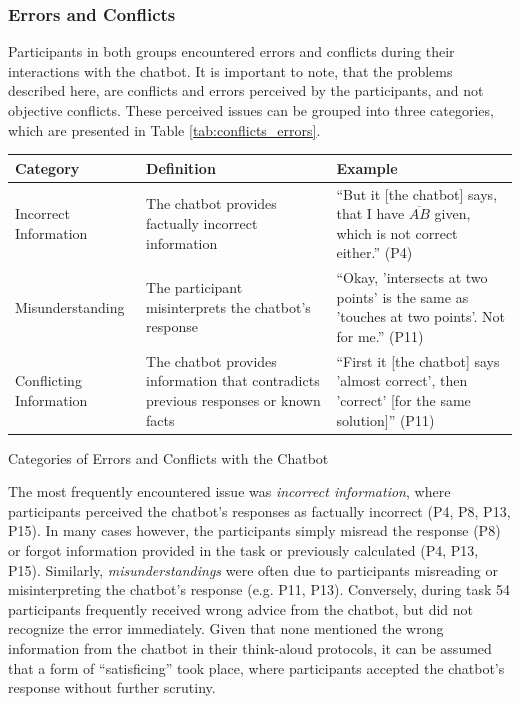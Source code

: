 \subsubsection{Errors and Conflicts} \label{sssec:errors_conflicts}

Participants in both groups encountered errors and conflicts during their interactions with the chatbot. It is important to note, that the problems described here, are conflicts and errors perceived by the participants, and not objective conflicts. These perceived issues can be grouped into three categories, which are presented in Table \ref{tab:conflicts_errors}.


\begin{ctable}
    \begin{tabularx}{\textwidth}{l|X|X}
        \textbf{Category} & \textbf{Definition} & \textbf{Example} \\
        \hline
        Incorrect Information & The chatbot provides factually incorrect information & “But it [the chatbot] says, that I have $\overline{AB}$ given, which is not correct either.” (P4) \\
        Misunderstanding & The participant misinterprets the chatbot's response & “Okay, 'intersects at two points' is the same as 'touches at two points'. Not for me.” (P11) \\
        Conflicting Information & The chatbot provides information that contradicts previous responses or known facts & “First it [the chatbot] says 'almost correct', then 'correct' [for the same solution]” (P11) \\
    \end{tabularx}
    \caption{Categories of Errors and Conflicts with the Chatbot}
    \label{tab:conflicts_errors}
\end{ctable}

The most frequently encountered issue was \textit{incorrect information}, where participants perceived the chatbot's responses as factually incorrect (P4, P8, P13, P15). In many cases however, the participants simply misread the response (P8) or forgot information provided in the task or previously calculated (P4, P13, P15). Similarly, \textit{misunderstandings} were often due to participants misreading or misinterpreting the chatbot's response (e.g. P11, P13). Conversely, during task 54 participants frequently received wrong advice from the chatbot, but did not recognize the error immediately. Given that none mentioned the wrong information from the chatbot in their think-aloud protocols, it can be assumed that a form of “satisficing” \parencite{Simon1955} took place, where participants accepted the chatbot's response without further scrutiny.

